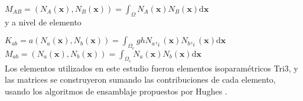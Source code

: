 $M_{AB} = (N_A(\boldsymbol{x}), N_B(\boldsymbol{x})) = \int_{\Omega} N_A(\boldsymbol{x}) N_B(\boldsymbol{x}) \mathrm{d}\boldsymbol{x} $\\

y a  nivel de elemento

$K_{ab} = a(N_a(\boldsymbol{x}), N_b(\boldsymbol{x})) = \int_{\Omega_e} gh N_a,_i(\boldsymbol{x}) N_b,_i(\boldsymbol{x}) \mathrm{d}\boldsymbol{x} $\\

$M_{ab} = (N_a(\boldsymbol{x}), N_b(\boldsymbol{x})) = \int_{\Omega_e} N_a(\boldsymbol{x}) N_b(\boldsymbol{x}) \mathrm{d}\boldsymbol{x} $\\

Los elementos utilizados en este estudio fueron elementos isoparam\'etricos Tri3, y las matrices se construyeron sumando las contribuciones de cada elemento, usando los algoritmos de ensamblaje propuestos por Hughes \cite{hughes2000}.







